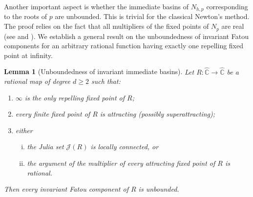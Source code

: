 \documentclass[12pt]{article}
\newtheorem{lem}{Lemma}[section]
\numberwithin{equation}{section}
\begin{document}
Another important aspect is whether the immediate basins of $N_{h,p}$ corresponding to the roots of $p$ are unbounded. This is trivial for the classical Newton's method. The proof relies on the fact that all multipliers of the fixed points of $N_{p}$ are real (see \cite[Proposition 6]{HSS2003} and \cite[Remark 3]{Felex1989}). We establish a general result on the unboundedness of invariant Fatou components for an arbitrary rational function having exactly one repelling fixed point at infinity.
\begin{lem}[Unboundedness of invariant immediate basins]
Let $R:\widehat{\mathbb C}\to\widehat{\mathbb C}$ be a rational map of degree $d\ge2$ such that:
\begin{enumerate}
\item $\infty$ is the only repelling fixed point of $R$;
\item every finite fixed point of $R$ is attracting (possibly superattracting);
\item either
 \begin{enumerate}[(i)]
	\item the Julia set $\mathcal{J}(R)$ is locally connected, or
	\item the argument of the multiplier of every attracting fixed point of $R$ is rational.
 \end{enumerate}
\end{enumerate}
Then every invariant Fatou component of $R$ is unbounded.
\end{lem}
\end{document}
